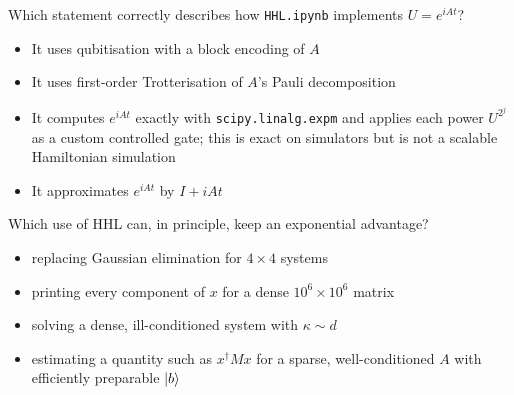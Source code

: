 \documentclass[11pt,a4paper]{article}
\newcommand{\optlabel}[1]{\textbf{(#1)}}
\newenvironment{qitem}[1]{\begin{list}{}{\setlength{\leftmargin}{3.3em}\setlength{\labelwidth}{3.1em}%
  \setlength{\labelsep}{0.2em}\setlength{\topsep}{3pt}\setlength{\parsep}{3pt}}\item[\textbf{Q.#1}\hfill]}{\end{list}}
\newcommand{\qsep}{\par\vspace{2pt}{\color{black!15}\hrule}\vspace{4pt}}
\begin{document}
\begin{qitem}{77}
Which statement correctly describes how \texttt{HHL.ipynb} implements $U = e^{iAt}$?
\begin{itemize}[leftmargin=2.6em, labelsep=0.4em, itemsep=2pt, topsep=3pt]
\item[\optlabel{A}] It uses qubitisation with a block encoding of $A$
\item[\optlabel{B}] It uses first-order Trotterisation of $A$'s Pauli decomposition
\item[\optlabel{C}] It computes $e^{iAt}$ exactly with \texttt{scipy.linalg.expm} and applies each power $U^{2^j}$ as a custom controlled gate; this is exact on simulators but is not a scalable Hamiltonian simulation
\item[\optlabel{D}] It approximates $e^{iAt}$ by $I + iAt$
\end{itemize}
\end{qitem}
\qsep

\begin{qitem}{78}
Which use of HHL can, in principle, keep an exponential advantage?
\begin{itemize}[leftmargin=2.6em, labelsep=0.4em, itemsep=2pt, topsep=3pt]
\item[\optlabel{A}] replacing Gaussian elimination for $4\times4$ systems
\item[\optlabel{B}] printing every component of $x$ for a dense $10^6\times10^6$ matrix
\item[\optlabel{C}] solving a dense, ill-conditioned system with $\kappa \sim d$
\item[\optlabel{D}] estimating a quantity such as $x^\dagger Mx$ for a sparse, well-conditioned $A$ with efficiently preparable $\ket b$
\end{itemize}
\end{qitem}
\qsep
\end{document}
